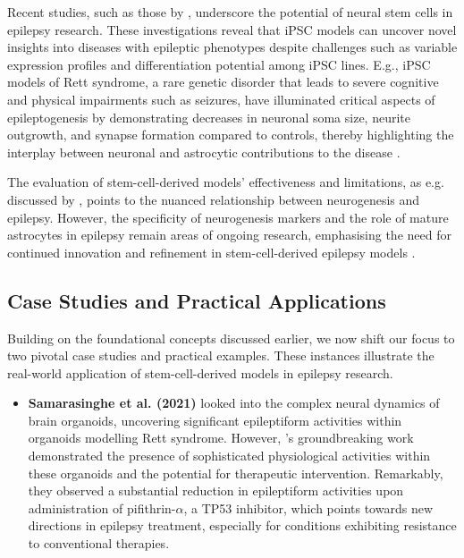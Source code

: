 \documentclass[10pt]{article}
\begin{document}
\begin{sloppypar}
  Recent studies, such as those by \citeauthor{thodeson_neural_2017} \citeyearpar{thodeson_neural_2017}, underscore the potential of neural stem cells in epilepsy research. These investigations reveal that iPSC models can uncover novel insights into diseases with epileptic phenotypes despite challenges such as variable expression profiles and differentiation potential among iPSC lines. E.g., iPSC models of Rett syndrome, a rare genetic disorder that leads to severe cognitive and physical impairments such as seizures, have illuminated critical aspects of epileptogenesis by demonstrating decreases in neuronal soma size, neurite outgrowth, and synapse formation compared to controls, thereby highlighting the interplay between neuronal and astrocytic contributions to the disease \citep{marchetto_model_2010}.

  The evaluation of stem-cell-derived models’ effectiveness and limitations, as e.g. discussed by \citeauthor{kandemir_investigation_2022} \citeyearpar{kandemir_investigation_2022}, points to the nuanced relationship between neurogenesis and epilepsy. However, the specificity of neurogenesis markers and the role of mature astrocytes in epilepsy remain areas of ongoing research, emphasising the need for continued innovation and refinement in stem-cell-derived epilepsy models \citep{jessberger_epilepsy_2015}.

  \subsection{Case Studies and Practical Applications}
  \label{sec:case-studies-and-practical-applications}

  Building on the foundational concepts discussed earlier, we now shift our focus to two pivotal case studies and practical examples. These instances illustrate the real-world application of stem-cell-derived models in epilepsy research.

  \vspace{0.5cm} %
  \begin{itemize}[leftmargin=*]
    \item \textbf{Samarasinghe et al. (2021)} looked into the complex neural dynamics of brain organoids, uncovering significant epileptiform activities within organoids modelling Rett syndrome. However, \citeauthor{samarasinghe_identification_2021}’s groundbreaking work demonstrated the presence of sophisticated physiological activities within these organoids and the potential for therapeutic intervention. Remarkably, they observed a substantial reduction in epileptiform activities upon administration of pifithrin-$\alpha$, a TP53 inhibitor, which points towards new directions in epilepsy treatment, especially for conditions exhibiting resistance to conventional therapies.


\end{itemize}
\end{sloppypar}
\end{document}
